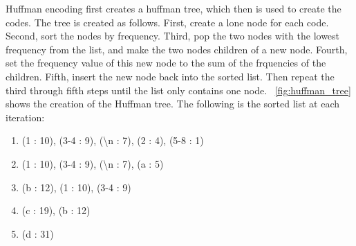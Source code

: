 Huffman encoding first creates a huffman tree, which then is used to create the codes. The tree is created as follows. First, create a lone node for each code. Second, sort the nodes by frequency. Third, pop the two nodes with the lowest frequency from the list, and make the two nodes children of a new node. Fourth, set the frequency value of this new node to the sum of the frquencies of the children. Fifth, insert the new node back into the sorted list. Then repeat the third through fifth steps until the list only contains one node. \figurename~\ref{fig:huffman_tree} shows the creation of the Huffman tree. The following is the sorted list at each iteration:
\begin{enumerate}
    \item (1 : 10), (3-4 : 9), (\textbackslash n : 7), (2 : 4), (5-8 : 1)
    \item (1 : 10), (3-4 : 9), (\textbackslash n : 7), (a : 5)
    \item (b : 12), (1 : 10), (3-4 : 9)
    \item (c : 19), (b : 12)
    \item (d : 31)
\end{enumerate}
